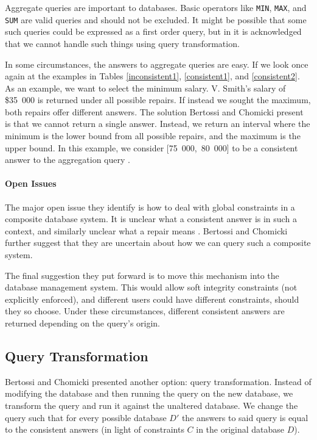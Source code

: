 Aggregate queries are important to databases. Basic operators like \texttt{MIN}, \texttt{MAX}, and \texttt{SUM} are valid queries and should not be excluded. It might be possible that some such queries could be expressed as a first order query, but in \cite{CQ} it is acknowledged that we cannot handle such things using query transformation. 

In some circumstances, the answers to aggregate queries are easy. If we look once again at the examples in Tables \ref{inconsistent1}, \ref{consistent1}, and \ref{consistent2}. As an example, we want to select the minimum salary. V. Smith's salary of \$35~000 is returned under all possible repairs. If instead we sought the maximum, both repairs offer different answers. The solution Bertossi and Chomicki present is that we cannot return a single answer. Instead, we return an interval where the minimum is the lower bound from all possible repairs, and the maximum is the upper bound. In this example, we consider [75~000,~80~000] to be a consistent answer to the aggregation query \cite{CQ}. 



\paragraph{Open Issues}

The major open issue they identify is how to deal with global constraints in a composite database system. It is unclear what a consistent answer is in such a context, and similarly unclear what a repair means \cite{CQ}. Bertossi and Chomicki further suggest that they are uncertain about how we can query such a composite system.

The final suggestion they put forward is to move this mechanism into the database management system. This would allow soft integrity constraints (not explicitly enforced), and different users could have different constraints, should they so choose. Under these circumstances, different consistent answers are returned depending on the query's origin.

\subsection*{Query Transformation}

Bertossi and Chomicki presented another option: query transformation. Instead of modifying the database and then running the query on the new database, we transform the query and run it against the unaltered database. We change the query such that for every possible database $D'$ the answers to said query is equal to the consistent answers (in light of constraints $C$ in the original database $D$).

